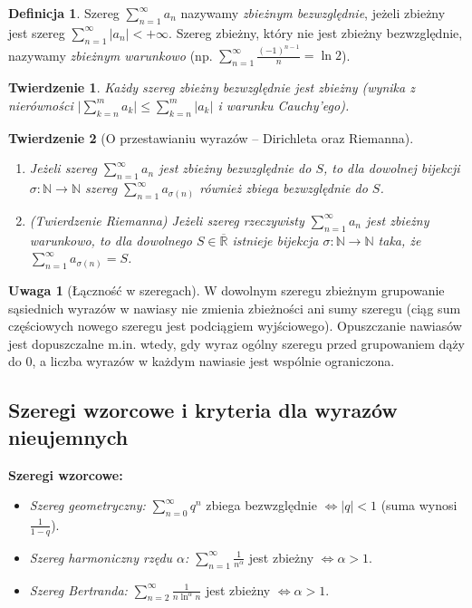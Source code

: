\documentclass[11pt, a4paper]{article}
\theoremstyle{plain}
\newtheorem*{twierdzenie}{Twierdzenie}
\theoremstyle{definition}
\newtheorem*{definicja}{Definicja}
\newtheorem*{uwaga}{Uwaga}
\begin{document}
\begin{definicja}
Szereg $\sum_{n=1}^\infty a_n$ nazywamy \emph{zbieżnym bezwzględnie}, jeżeli zbieżny jest szereg $\sum_{n=1}^\infty \lvert a_n \rvert < +\infty$. Szereg zbieżny, który nie jest zbieżny bezwzględnie, nazywamy \emph{zbieżnym warunkowo} (np. $\sum_{n=1}^\infty \frac{(-1)^{n-1}}{n} = \ln 2$).
\end{definicja}

\begin{twierdzenie}
Każdy szereg zbieżny bezwzględnie jest zbieżny (wynika z nierówności $\bigl\lvert \sum_{k=n}^m a_k \bigr\rvert \leqslant \sum_{k=n}^m \lvert a_k \rvert$ i warunku Cauchy'ego).
\end{twierdzenie}

\begin{twierdzenie}[O przestawianiu wyrazów -- Dirichleta oraz Riemanna]
\begin{enumerate}
    \item Jeżeli szereg $\sum_{n=1}^\infty a_n$ jest zbieżny bezwzględnie do $S$, to dla dowolnej bijekcji $\sigma \colon \mathbb{N} \to \mathbb{N}$ szereg $\sum_{n=1}^\infty a_{\sigma(n)}$ również zbiega bezwzględnie do $S$.
    \item \emph{(Twierdzenie Riemanna)} Jeżeli szereg rzeczywisty $\sum_{n=1}^\infty a_n$ jest zbieżny warunkowo, to dla dowolnego $S \in \overline{\mathbb{R}}$ istnieje bijekcja $\sigma \colon \mathbb{N} \to \mathbb{N}$ taka, że $\sum_{n=1}^\infty a_{\sigma(n)} = S$.
\end{enumerate}
\end{twierdzenie}

\begin{uwaga}[Łączność w szeregach]
W dowolnym szeregu zbieżnym grupowanie sąsiednich wyrazów w nawiasy nie zmienia zbieżności ani sumy szeregu (ciąg sum częściowych nowego szeregu jest podciągiem wyjściowego). Opuszczanie nawiasów jest dopuszczalne m.in. wtedy, gdy wyraz ogólny szeregu przed grupowaniem dąży do $0$, a liczba wyrazów w każdym nawiasie jest wspólnie ograniczona.
\end{uwaga}

\subsection{Szeregi wzorcowe i kryteria dla wyrazów nieujemnych}

\noindent\textbf{Szeregi wzorcowe:}
\begin{itemize}
    \item \emph{Szereg geometryczny:} $\sum_{n=0}^\infty q^n$ zbiega bezwzględnie $\iff \lvert q \rvert < 1$ (suma wynosi $\frac{1}{1-q}$).
    \item \emph{Szereg harmoniczny rzędu $\alpha$:} $\sum_{n=1}^\infty \frac{1}{n^\alpha}$ jest zbieżny $\iff \alpha > 1$.
    \item \emph{Szereg Bertranda:} $\sum_{n=2}^\infty \frac{1}{n \ln^\alpha n}$ jest zbieżny $\iff \alpha > 1$.
\end{itemize}
\end{document}
